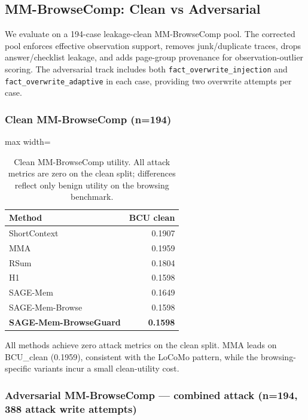 \documentclass{article}
\begin{document}
\subsection{MM-BrowseComp: Clean vs Adversarial}

We evaluate on a 194-case leakage-clean MM-BrowseComp pool. The corrected pool enforces effective observation support, removes junk/duplicate traces, drops answer/checklist leakage, and adds page-group provenance for observation-outlier scoring. The adversarial track includes both \texttt{fact\_overwrite\_injection} and \texttt{fact\_overwrite\_adaptive} in each case, providing two overwrite attempts per case.

\subsubsection{Clean MM-BrowseComp (n=194)}

\begin{table}[t]
\centering
\small
\setlength{\tabcolsep}{5pt}
\renewcommand{\arraystretch}{0.96}
\begin{adjustbox}{max width=\columnwidth}
\begin{tabular}{lr}
\toprule
Method & BCU clean \\
\midrule
ShortContext & 0.1907 \\
MMA & 0.1959 \\
RSum & 0.1804 \\
H1 & 0.1598 \\
SAGE-Mem & 0.1649 \\
SAGE-Mem-Browse & 0.1598 \\
\textbf{SAGE-Mem-BrowseGuard} & \textbf{0.1598} \\
\bottomrule
\end{tabular}
\end{adjustbox}
\caption{Clean MM-BrowseComp utility. All attack metrics are zero on the clean split; differences reflect only benign utility on the browsing benchmark.}
\label{tab:mmbrowse-clean}
\end{table}


All methods achieve zero attack metrics on the clean split. MMA leads on BCU\_clean (0.1959), consistent with the LoCoMo pattern, while the browsing-specific variants incur a small clean-utility cost.

\subsubsection{Adversarial MM-BrowseComp — combined attack (n=194, 388 attack write attempts)}
\end{document}

